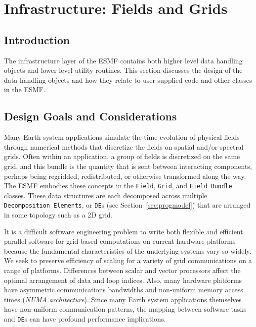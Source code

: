 \section{Infrastructure: Fields and Grids}
\label{sec:fieldclasses}

\subsection{Introduction}

The infrastructure layer of the ESMF contains both 
higher level data handling objects and lower level utility routines.
This section discusses the design of the data handling objects and 
how they relate to user-supplied code and other classes in the ESMF.  

\subsection{Design Goals and Considerations}

Many Earth system applications simulate the time evolution of physical 
fields through numerical methods that discretize the fields on spatial 
and/or spectral grids.  Often
within an application, a group of fields is discretized on the
same grid, and this bundle is the quantity that is sent between 
interacting components, perhaps being regridded, redistributed, or 
otherwise transformed along the way.  The ESMF embodies these concepts 
in the {\tt Field}, {\tt Grid}, and {\tt Field Bundle} classes.
These data structures are each decomposed across multiple {\tt Decomposition
Elements}, or {\tt DE}s (see Section~\ref{sec:progmodel}) that are arranged 
in some topology such as a 2D grid.

It is a difficult software engineering problem to write both flexible 
and efficient parallel software for grid-based computations on current 
hardware platforms because the fundamental characteristics of the underlying
systems vary so widely.  We seek to preserve efficiency of scaling
for a variety of grid communications on a range of platforms.  
Differences between scalar and vector processors affect 
the optimal arrangement of data and loop indices.  Also, many hardware 
platforms have asymmetric communications bandwidths and 
non-uniform memory access times ({\it NUMA architecture}).
Since many Earth system applications themselves have non-uniform 
communication patterns, the mapping between software tasks and 
{\tt DE}s can have profound performance implications.  

